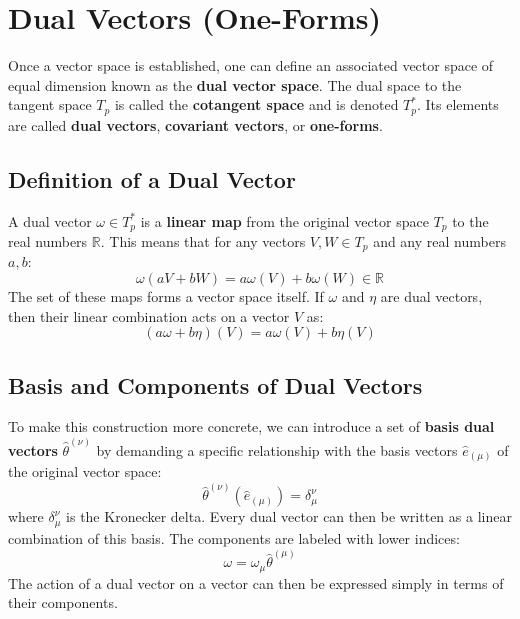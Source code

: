 \documentclass[11pt, a4paper]{report}
\begin{document}
\section{Dual Vectors (One-Forms)}

Once a vector space is established, one can define an associated vector space of equal dimension known as the \textbf{dual vector space}. The dual space to the tangent space $T_p$ is called the \textbf{cotangent space} and is denoted $T_p^*$. Its elements are called \textbf{dual vectors}, \textbf{covariant vectors}, or \textbf{one-forms}.

\subsection*{Definition of a Dual Vector}

A dual vector $\omega \in T_p^*$ is a \textbf{linear map} from the original vector space $T_p$ to the real numbers $\mathbb{R}$. This means that for any vectors $V, W \in T_p$ and any real numbers $a, b$:
\begin{equation}
    \omega(aV + bW) = a\omega(V) + b\omega(W) \in \mathbb{R}
\end{equation}
The set of these maps forms a vector space itself. If $\omega$ and $\eta$ are dual vectors, then their linear combination acts on a vector $V$ as:
\begin{equation}
    (a\omega + b\eta)(V) = a\omega(V) + b\eta(V)
\end{equation}

\subsection*{Basis and Components of Dual Vectors}

To make this construction more concrete, we can introduce a set of \textbf{basis dual vectors} $\hat{\theta}^{(\nu)}$ by demanding a specific relationship with the basis vectors $\hat{e}_{(\mu)}$ of the original vector space:
\begin{equation}
    \hat{\theta}^{(\nu)}(\hat{e}_{(\mu)}) = \delta^\nu_\mu
\end{equation}
where $\delta^\nu_\mu$ is the Kronecker delta. Every dual vector can then be written as a linear combination of this basis. The components are labeled with lower indices:
\begin{equation}
    \omega = \omega_\mu \hat{\theta}^{(\mu)}
\end{equation}
The action of a dual vector on a vector can then be expressed simply in terms of their components.
\end{document}
